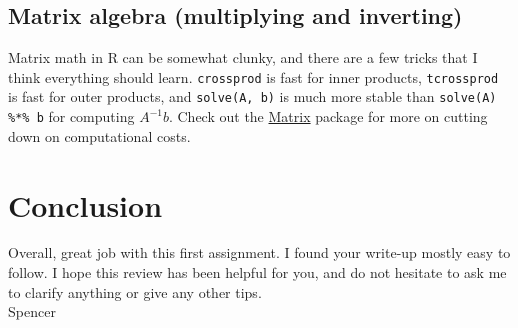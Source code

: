 \documentclass[11pt]{article}
\begin{document}
\subsection{Matrix algebra (multiplying and inverting)}

Matrix math in \textsf{R} can be somewhat clunky, and there are a few tricks that I think everything should learn. \texttt{crossprod} is fast for inner products, \texttt{tcrossprod} is fast for outer products, and \texttt{solve(A, b)} is much more stable than \texttt{solve(A) \%*\% b} for computing $A^{-1}b$. Check out the \href{https://cran.r-project.org/web/packages/Matrix/index.html}{Matrix} package for more on cutting down on computational costs.

\section{Conclusion}

Overall, great job with this first assignment. I found your write-up mostly easy to follow. I hope this review has been helpful for you, and do not hesitate to ask me to clarify anything or give any other tips. \\

Spencer
\end{document}
